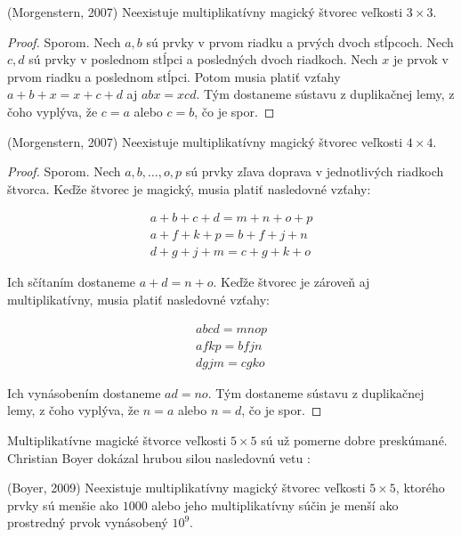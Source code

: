 \begin{theorem} (Morgenstern, 2007) Neexistuje multiplikatívny magický štvorec veľkosti $3 \times 3$.
\end{theorem}

\begin{proof} Sporom. Nech $a,b$ sú prvky v prvom riadku a prvých dvoch stĺpcoch. Nech $c,d$ sú prvky v poslednom stĺpci a posledných dvoch riadkoch. Nech $x$ je prvok v prvom riadku a poslednom stĺpci. Potom musia platiť vzťahy $a + b + x = x + c + d$ aj $abx = xcd$. Tým dostaneme sústavu z duplikačnej lemy, z čoho vyplýva, že $c = a$ alebo $c = b$, čo je spor.
\end{proof}

\begin{theorem} (Morgenstern, 2007) Neexistuje multiplikatívny magický štvorec veľkosti $4 \times 4$.
\end{theorem} 

\begin{proof} Sporom. Nech $a, b, \dots , o, p$ sú prvky zľava doprava v jednotlivých riadkoch štvorca. Keďže štvorec je magický, musia platiť nasledovné vzťahy:

\begin{gather*}
a + b + c + d = m + n + o + p \\
a + f + k + p = b + f + j + n \\
d + g + j + m = c + g + k + o
\end{gather*}

Ich sčítaním dostaneme $a + d = n + o$. Keďže štvorec je zároveň aj multiplikatívny, musia platiť nasledovné vzťahy:

\begin{gather*}
abcd = mnop \\
afkp = bfjn \\
dgjm = cgko
\end{gather*}

Ich vynásobením dostaneme $ad = no$. Tým dostaneme sústavu z duplikačnej lemy, z čoho vyplýva, že $n = a$ alebo $n = d$, čo je spor.
\end{proof}

Multiplikatívne magické štvorce veľkosti $5 \times 5$ sú už pomerne dobre preskúmané. Christian Boyer dokázal hrubou silou nasledovnú vetu \cite{multimagie}:

\begin{theorem} (Boyer, 2009) Neexistuje multiplikatívny magický štvorec veľkosti $5 \times 5$, ktorého prvky sú menšie ako $1000$ alebo jeho multiplikatívny súčin je menší ako prostredný prvok vynásobený $10^9$.
\end{theorem}

